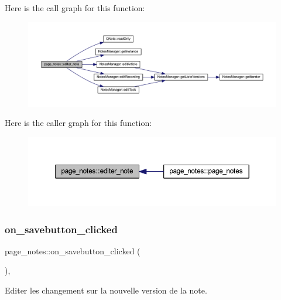 Here is the call graph for this function\+:\nopagebreak
\begin{figure}[H]
\begin{center}
\leavevmode
\includegraphics[width=350pt]{classpage__notes_a9fd367fb577c6048353f18ad56792c1f_cgraph}
\end{center}
\end{figure}
Here is the caller graph for this function\+:\nopagebreak
\begin{figure}[H]
\begin{center}
\leavevmode
\includegraphics[width=350pt]{classpage__notes_a9fd367fb577c6048353f18ad56792c1f_icgraph}
\end{center}
\end{figure}
\mbox{\label{classpage__notes_a3810696feb56abdad663cb7ae4b2f1b0}} 
\subsubsection{\texorpdfstring{on\+\_\+savebutton\+\_\+clicked}{on\_savebutton\_clicked}}
{\footnotesize\ttfamily page\+\_\+notes\+::on\+\_\+savebutton\+\_\+clicked (\begin{DoxyParamCaption}{ }\end{DoxyParamCaption})\hspace{0.3cm}{\ttfamily [inline]}, {\ttfamily [slot]}}



Editer les changement sur la nouvelle version de la note. 

